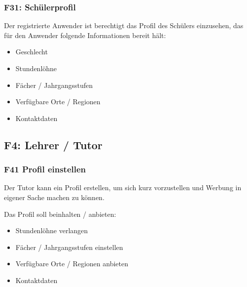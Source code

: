 \documentclass[10pt,a4paper]{scrartcl}
\begin{document}
%

\subsubsection*{F31: Schülerprofil}

Der registrierte Anwender ist berechtigt das Profil des Schülers einzusehen, das für den Anwender folgende Informationen bereit hält:

\begin{itemize}
	\item Geschlecht
	\item Stundenlöhne
	\item Fächer / Jahrgangsstufen
	\item Verfügbare Orte / Regionen
	\item Kontaktdaten
\end{itemize}



\subsection{F4: Lehrer / Tutor}
\subsubsection*{F41 Profil einstellen}
Der Tutor kann ein Profil erstellen, um sich kurz vorzustellen und Werbung in eigener Sache machen zu können.

Das Profil soll beinhalten / anbieten:
\begin{itemize}
	\item Stundenlöhne verlangen
	\item Fächer / Jahrgangsstufen einstellen
	\item Verfügbare Orte / Regionen anbieten
	\item Kontaktdaten
\end{itemize}
\end{document}
